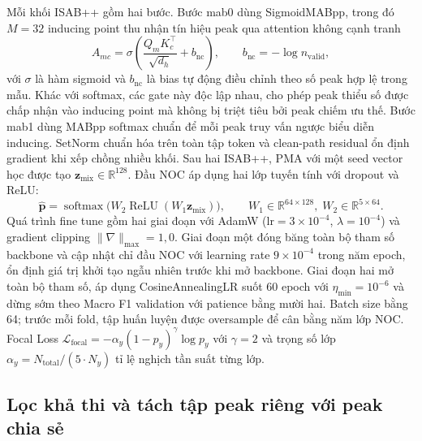 \documentclass[12pt,a4paper]{article}
\begin{document}
Mỗi khối ISAB++ gồm hai bước. Bước mab0 dùng SigmoidMABpp, trong đó $M=32$ inducing point thu nhận tín hiệu peak qua attention không cạnh tranh
\begin{equation}
A_{mc}=\sigma\!\left(\frac{Q_mK_c^\top}{\sqrt{d_h}}+b_{\mathrm{nc}}\right),
\qquad b_{\mathrm{nc}}=-\log n_{\mathrm{valid}},
\end{equation}
với $\sigma$ là hàm sigmoid và $b_{\mathrm{nc}}$ là bias tự động điều chỉnh theo số peak hợp lệ trong mẫu. Khác với softmax, các gate này độc lập nhau, cho phép peak thiểu số được chấp nhận vào inducing point mà không bị triệt tiêu bởi peak chiếm ưu thế. Bước mab1 dùng MABpp softmax chuẩn để mỗi peak truy vấn ngược biểu diễn inducing. SetNorm chuẩn hóa trên toàn tập token và clean-path residual ổn định gradient khi xếp chồng nhiều khối. Sau hai ISAB++, PMA với một seed vector học được tạo $\bm{z}_{\mathrm{mix}}\in\mathbb{R}^{128}$. Đầu NOC áp dụng hai lớp tuyến tính với dropout và ReLU:
\begin{equation}
\hat{\bm{p}} = \operatorname{softmax}\!\bigl(W_2\operatorname{ReLU}(W_1\bm{z}_{\mathrm{mix}})\bigr),
\qquad W_1\in\mathbb{R}^{64\times128},\;W_2\in\mathbb{R}^{5\times64}.
\end{equation}
Quá trình fine tune gồm hai giai đoạn với AdamW ($\text{lr}=3\times10^{-4}$, $\lambda=10^{-4}$) và gradient clipping $\|\nabla\|_{\max}=1{,}0$. Giai đoạn một đóng băng toàn bộ tham số backbone và cập nhật chỉ đầu NOC với learning rate $9\times10^{-4}$ trong năm epoch, ổn định giá trị khởi tạo ngẫu nhiên trước khi mở backbone. Giai đoạn hai mở toàn bộ tham số, áp dụng CosineAnnealingLR suốt 60 epoch với $\eta_{\min}=10^{-6}$ và dừng sớm theo Macro F1 validation với patience bằng mười hai. Batch size bằng 64; trước mỗi fold, tập huấn luyện được oversample để cân bằng năm lớp NOC. Focal Loss $\mathcal{L}_{\mathrm{focal}} = -\alpha_y(1-p_y)^{\gamma}\log p_y$ với $\gamma=2$ và trọng số lớp $\alpha_y = N_{\mathrm{total}}/(5\cdot N_y)$ tỉ lệ nghịch tần suất từng lớp.

\subsection{Lọc khả thi và tách tập peak riêng với peak chia sẻ}
\end{document}

